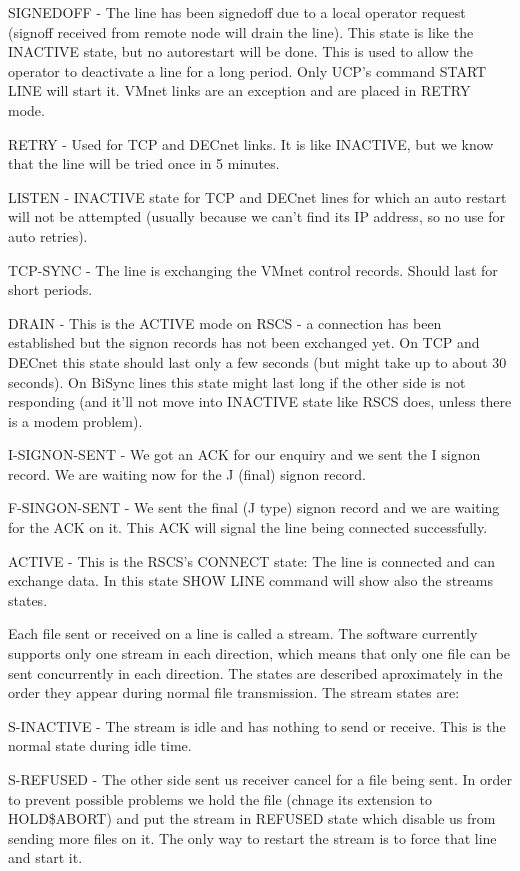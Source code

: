 SIGNEDOFF - The line has been signedoff due to a local operator  request
(signoff  received  from remote node will drain the line). This state is
like the INACTIVE state, but no autorestart will be done. This  is  used
to allow the operator to deactivate a line for a long period. Only UCP's
command START LINE will start it. VMnet links are an exception  and  are
placed in RETRY mode.

RETRY  - Used for TCP and DECnet links. It is like INACTIVE, but we know
that the line will be tried once in 5 minutes.

LISTEN - INACTIVE state for TCP and  DECnet  lines  for  which  an  auto
restart  will  not  be  attempted  (usually because we can't find its IP
address, so no use for auto retries).

TCP-SYNC - The line is exchanging the VMnet control records. Should last
for short periods.

DRAIN  -  This  is  the  ACTIVE  mode  on  RSCS  - a connection has been
established but the signon records has not been exchanged  yet.  On  TCP
and  DECnet this state should last only a few seconds (but might take up
to about 30 seconds). On BiSync lines this state might last long if  the
other  side  is  not  responding (and it'll not move into INACTIVE state
like RSCS does, unless there is a modem problem).

I-SIGNON-SENT - We got an ACK for our enquiry and we sent the  I  signon
record. We are waiting now for the J (final) signon record.

F-SINGON-SENT  -  We  sent  the  final (J type) signon record and we are
waiting for the ACK on it. This ACK will signal the line being connected
successfully.

ACTIVE - This is the RSCS's CONNECT state: The line is connected and can
exchange data. In this state  SHOW  LINE  command  will  show  also  the
streams states.


Each file sent or received on a line is called a stream. The software
currently supports only one stream in each direction, which  means  that
only one file can be sent concurrently in each direction. The states are
described aproximately in the  order  they  appear  during  normal  file
transmission. The stream states are:

S-INACTIVE - The stream is idle and has nothing to send or receive. This
is the normal state during idle time.

S-REFUSED - The other side sent us receiver  cancel  for  a  file  being
sent. In order to prevent possible problems we hold the file (chnage its
extension to HOLD\$ABORT) and put  the  stream  in  REFUSED  state  which
disable  us  from  sending more files on it. The only way to restart the
stream is to force that line and start it.

